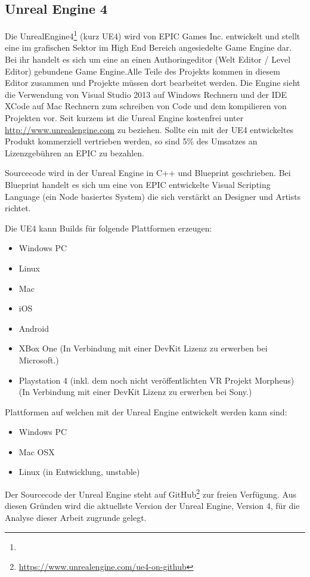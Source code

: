 \documentclass[pagesize, paper=a4, fontsize=12pt, titlepage=true, headings=small, headnosepline, abstractoff, liststotoc, nochapterprefix, plainheadsepline, twoside]{scrreprt}
\begin{document}
\subsection{Unreal Engine 4}
Die UnrealEngine4\footnote{} (kurz UE4) wird von EPIC Games Inc. entwickelt und stellt eine im grafischen Sektor im High End Bereich angesiedelte Game Engine dar. Bei ihr handelt es sich um eine an einen Authoringeditor (Welt Editor / Level Editor) gebundene Game Engine.Alle Teile des Projekts kommen in diesem Editor zusammen und Projekte müssen dort bearbeitet werden. Die Engine sieht die Verwendung von Visual Studio 2013 auf Windows Rechnern und der IDE XCode auf Mac Rechnern zum schreiben von Code und dem kompilieren von Projekten vor. Seit kurzem ist die Unreal Engine kostenfrei unter \url{http://www.unrealengine.com} zu beziehen. Sollte ein mit der UE4 entwickeltes Produkt kommerziell vertrieben werden, so sind 5\% des Umsatzes an Lizenzgebühren an EPIC zu bezahlen.

Sourcecode wird in der Unreal Engine in C++ und Blueprint geschrieben. Bei Blueprint handelt es sich um eine von EPIC entwickelte Visual Scripting Language (ein Node basiertes System) die sich verstärkt an Designer und Artists richtet.

Die UE4 kann Builds für folgende Plattformen erzeugen:
\begin{itemize}
\item Windows PC
\item Linux
\item Mac
\item iOS
\item Android
\item XBox One (In Verbindung mit einer DevKit Lizenz zu erwerben bei Microsoft.)
\item Playstation 4 (inkl. dem noch nicht veröffentlichten VR Projekt Morpheus) (In Verbindung mit einer DevKit Lizenz zu erwerben bei Sony.)
\end{itemize}

Plattformen auf welchen mit der Unreal Engine entwickelt werden kann sind:
\begin{itemize}
\item Windows PC
\item Mac OSX
\item Linux (in Entwicklung, unstable)
\end{itemize}

Der Sourcecode der Unreal Engine steht auf GitHub\footnote{\url{https://www.unrealengine.com/ue4-on-github}} zur freien Verfügung. Aus diesen Gründen wird die aktuellste Version der Unreal Engine, Version 4, für die Analyse dieser Arbeit zugrunde gelegt.
\end{document}
